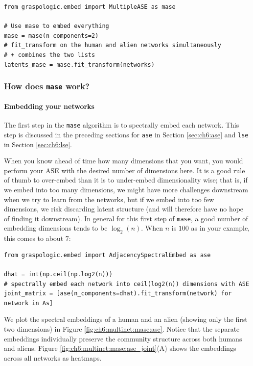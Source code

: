 \begin{lstlisting}[style=python]
from graspologic.embed import MultipleASE as mase

# Use mase to embed everything
mase = mase(n_components=2)
# fit_transform on the human and alien networks simultaneously
# + combines the two lists
latents_mase = mase.fit_transform(networks)
\end{lstlisting}

\subsubsection{How does \texttt{mase} work?}

\paragraph*{Embedding your networks}

The first step in the \texttt{mase} algorithm is to spectrally embed each network. This step is discussed in the preceding sections for \texttt{ase} in Section \ref{sec:ch6:ase} and \texttt{lse} in Section \ref{sec:ch6:lse}. 

When you know ahead of time how many dimensions that you want, you would perform your ASE with the desired number of dimensions here. It is a good rule of thumb to over-embed than it is to under-embed dimensionality wise; that is, if we embed into too many dimensions, we might have more challenges downstream when we try to learn from the networks, but if we embed into too few dimensions, we risk discarding latent structure (and will therefore have no hope of finding it downstream). In general for this first step of \texttt{mase}, a good number of embedding dimensions tends to be $\log_2(n)$. When $n$ is $100$ as in your example, this comes to about $7$:

\begin{lstlisting}[style=python]
from graspologic.embed import AdjacencySpectralEmbed as ase

dhat = int(np.ceil(np.log2(n)))
# spectrally embed each network into ceil(log2(n)) dimensions with ASE
joint_matrix = [ase(n_components=dhat).fit_transform(network) for network in As]
\end{lstlisting}

We plot the spectral embeddings of a human and an alien (showing only the first two dimensions) in Figure \ref{fig:ch6:multinet:mase:ase}. Notice that the separate embeddings individually preserve the community structure across both humans and aliens. Figure \ref{fig:ch6:multinet:mase:ase_joint}(A) shows the embeddings across all networks as heatmaps.

